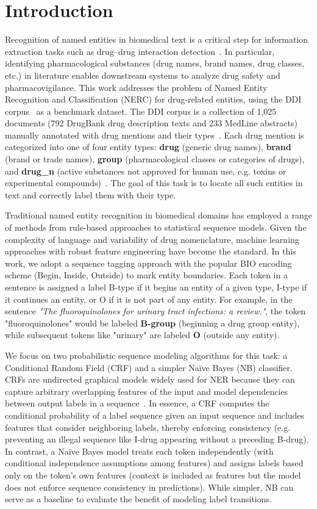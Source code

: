 \section{Introduction}
Recognition of named entities in biomedical text is a critical step for information extraction tasks such as drug–drug interaction detection~\cite{ddi-corpus}. In particular, identifying pharmacological substances (drug names, brand names, drug classes, etc.) in literature enables downstream systems to analyze drug safety and pharmacovigilance. This work addresses the problem of Named Entity Recognition and Classification (NERC) for drug-related entities, using the DDI corpus~\cite{ddi-corpus} as a benchmark dataset. The DDI corpus is a collection of 1,025 documents (792 DrugBank drug description texts and 233 MedLine abstracts) manually annotated with drug mentions and their types~\cite{ddi-corpus}. Each drug mention is categorized into one of four entity types: \textbf{drug} (generic drug names), \textbf{brand} (brand or trade names), \textbf{group} (pharmacological classes or categories of drugs), and \textbf{drug\_n} (active substances not approved for human use, e.g. toxins or experimental compounds)~\cite{ddi-lessons}. The goal of this task is to locate all such entities in text and correctly label them with their type.

Traditional named entity recognition in biomedical domains has employed a range of methods from rule-based approaches to statistical sequence models. Given the complexity of language and variability of drug nomenclature, machine learning approaches with robust feature engineering have become the standard. In this work, we adopt a sequence tagging approach with the popular BIO encoding scheme (Begin, Inside, Outside) to mark entity boundaries. Each token in a sentence is assigned a label B-type if it begins an entity of a given type, I-type if it continues an entity, or O if it is not part of any entity. For example, in the sentence \textit{"The fluoroquinolones for urinary tract infections: a review."}, the token "fluoroquinolones" would be labeled \textbf{B-group} (beginning a drug group entity), while subsequent tokens like "urinary" are labeled \textbf{O} (outside any entity).

We focus on two probabilistic sequence modeling algorithms for this task: a Conditional Random Field (CRF) and a simpler Naïve Bayes (NB) classifier. CRFs are undirected graphical models widely used for NER because they can capture arbitrary overlapping features of the input and model dependencies between output labels in a sequence~\cite{crf-tutorial}. In essence, a CRF computes the conditional probability of a label sequence given an input sequence and includes features that consider neighboring labels, thereby enforcing consistency (e.g. preventing an illegal sequence like I-drug appearing without a preceding B-drug). In contrast, a Naïve Bayes model treats each token independently (with conditional independence assumptions among features) and assigns labels based only on the token's own features (context is included as features but the model does not enforce sequence consistency in predictions). While simpler, NB can serve as a baseline to evaluate the benefit of modeling label transitions.


